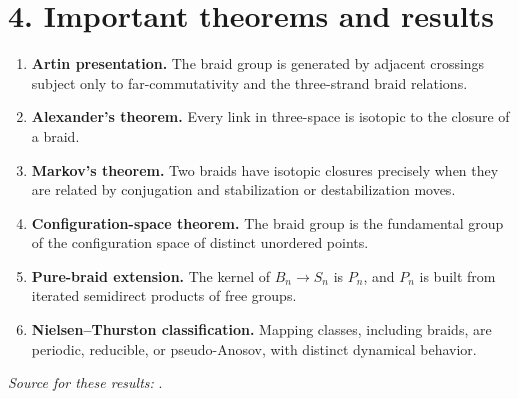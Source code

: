 \section*{4. Important theorems and results}
\begin{enumerate}[leftmargin=*,itemsep=0.35em]

\item \textbf{Artin presentation.} The braid group is generated by adjacent crossings subject only to far-commutativity and the three-strand braid relations.

\item \textbf{Alexander's theorem.} Every link in three-space is isotopic to the closure of a braid.

\item \textbf{Markov's theorem.} Two braids have isotopic closures precisely when they are related by conjugation and stabilization or destabilization moves.

\item \textbf{Configuration-space theorem.} The braid group is the fundamental group of the configuration space of distinct unordered points.

\item \textbf{Pure-braid extension.} The kernel of $B_n\to S_n$ is $P_n$, and $P_n$ is built from iterated semidirect products of free groups.

\item \textbf{Nielsen--Thurston classification.} Mapping classes, including braids, are periodic, reducible, or pseudo-Anosov, with distinct dynamical behavior.
\end{enumerate}
\noindent\emph{Source for these results:} \cite{braid_theory_ref1}.


